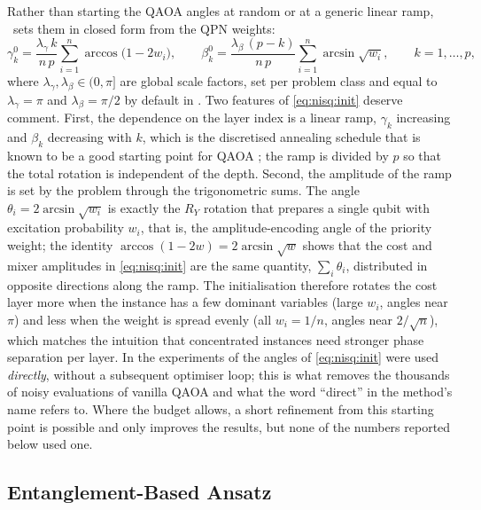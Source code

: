 Rather than starting the QAOA angles at random or at a generic linear ramp, \deal\ sets them in closed form from the QPN weights:
\begin{equation}\label{eq:nisq:init}
  \gamma_{k}^{0} = \frac{\lambda_{\gamma}\, k}{n\,p}\sum_{i=1}^{n} \arccos\bigl(1-2w_{i}\bigr),
  \qquad
  \beta_{k}^{0} = \frac{\lambda_{\beta}\,(p-k)}{n\,p}\sum_{i=1}^{n} \arcsin\sqrt{w_{i}},
  \qquad k=1,\dots,p,
\end{equation}
where $\lambda_{\gamma},\lambda_{\beta}\in(0,\pi]$ are global scale factors, set per problem class and equal to $\lambda_{\gamma}=\pi$ and $\lambda_{\beta}=\pi/2$ by default in \cite{guo2025deal}. Two features of \cref{eq:nisq:init} deserve comment. First, the dependence on the layer index is a linear ramp, $\gamma_{k}$ increasing and $\beta_{k}$ decreasing with $k$, which is the discretised annealing schedule that is known to be a good starting point for QAOA \cite{weidenfeller2022qaoascaling,sachdeva2024qaoa127}; the ramp is divided by $p$ so that the total rotation is independent of the depth. Second, the amplitude of the ramp is set by the problem through the trigonometric sums. The angle $\theta_{i}=2\arcsin\sqrt{w_{i}}$ is exactly the $R_{Y}$ rotation that prepares a single qubit with excitation probability $w_{i}$, that is, the amplitude-encoding angle of the priority weight; the identity $\arccos(1-2w)=2\arcsin\sqrt{w}$ shows that the cost and mixer amplitudes in \cref{eq:nisq:init} are the same quantity, $\sum_{i}\theta_{i}$, distributed in opposite directions along the ramp. The initialisation therefore rotates the cost layer more when the instance has a few dominant variables (large $w_{i}$, angles near $\pi$) and less when the weight is spread evenly (all $w_{i}=1/n$, angles near $2/\sqrt{n}$), which matches the intuition that concentrated instances need stronger phase separation per layer. In the experiments of \cite{guo2025deal} the angles of \cref{eq:nisq:init} were used \emph{directly}, without a subsequent optimiser loop; this is what removes the thousands of noisy evaluations of vanilla QAOA and what the word ``direct'' in the method's name refers to. Where the budget allows, a short refinement from this starting point is possible and only improves the results, but none of the numbers reported below used one.

\subsection{Entanglement-Based Ansatz}\label{sec:nisq:ansatz}

